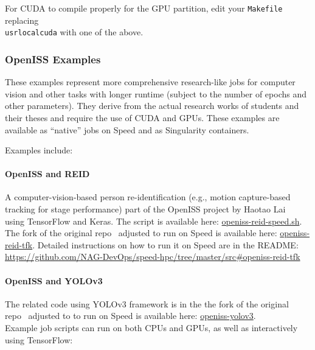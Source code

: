 For CUDA to compile properly for the GPU partition, edit your \texttt{Makefile} replacing\\
\texttt{\/usr\/local\/cuda} with one of the above.

\subsubsection{OpenISS Examples}
\label{sect:openiss-examples}

These examples represent more comprehensive research-like jobs
for computer vision and other tasks with longer runtime (subject to the number of epochs and other parameters).
They derive from the actual research works of students and their theses and require the use of CUDA and GPUs.
These examples are available as ``native'' jobs on Speed and as Singularity containers.

\noindent Examples include:
\paragraph{OpenISS and REID}
\label{sect:openiss-reid}

A computer-vision-based person re-identification 
(e.g., motion capture-based tracking for stage performance) part of the OpenISS
project by Haotao Lai~\cite{lai-haotao-mcthesis19} using TensorFlow and Keras.
The script is available here:
\href{https://github.com/NAG-DevOps/speed-hpc/blob/master/src/openiss-reid-speed.sh}{openiss-reid-speed.sh}.
The fork of the original repo~\cite{openiss-reid-tfk} adjusted to run on Speed is available here:
\href{https://github.com/NAG-DevOps/openiss-reid-tfk}{openiss-reid-tfk}.
Detailed instructions on how to run it on Speed are in the README:
\url{https://github.com/NAG-DevOps/speed-hpc/tree/master/src#openiss-reid-tfk}

\paragraph{OpenISS and YOLOv3}
\label{sect:openiss-yolov3}

The related code using YOLOv3 framework is in the
the fork of the original repo~\cite{openiss-yolov3} adjusted
to to run on Speed is available here: \href{https://github.com/NAG-DevOps/openiss-yolov3}{openiss-yolov3}.\\

\noindent Example job scripts can run on both CPUs and GPUs, as well as interactively using TensorFlow:

